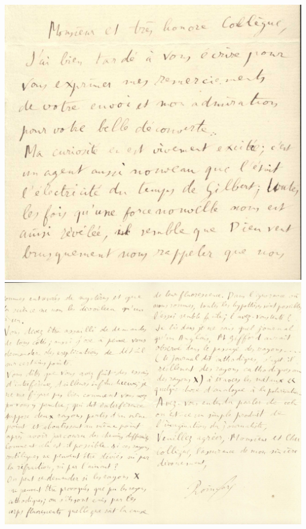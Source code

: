 \documentclass[a4paper,12pt]{report}
\begin{document}
\begin{center}
  \includegraphics[scale = 0.8]{letter1.jpg}
  \includegraphics[scale = 0.6]{letter2.jpg}
\end{center}
\end{document}
